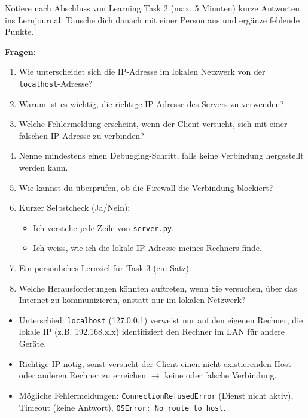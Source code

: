 \begin{myexercise}
    Notiere nach Abschluss von Learning Task 2 (max. 5 Minuten) kurze Antworten ins Lernjournal. Tausche dich danach mit einer Person aus und ergänze fehlende Punkte.

    \textbf{Fragen:}
    \begin{enumerate}
        \item Wie unterscheidet sich die \gls{IP}-Adresse im lokalen Netzwerk von der \texttt{localhost}-Adresse?
        \item Warum ist es wichtig, die richtige \gls{IP}-Adresse des Servers zu verwenden?
        \item Welche Fehlermeldung erscheint, wenn der Client versucht, sich mit einer falschen \gls{IP}-Adresse zu verbinden?
        \item Nenne mindestens einen Debugging-Schritt, falls keine Verbindung hergestellt werden kann.
        \item Wie kannst du überprüfen, ob die Firewall die Verbindung blockiert?
        \item Kurzer Selbstcheck (Ja/Nein):
              \begin{itemize}
                  \item Ich verstehe jede Zeile von \texttt{server.py}.
                  \item Ich weiss, wie ich die lokale IP-Adresse meines Rechners finde.
              \end{itemize}
        \item Ein persönliches Lernziel für Task 3 (ein Satz).
        \item Welche Herausforderungen könnten auftreten, wenn Sie versuchen, über das Internet zu kommunizieren, anstatt nur im lokalen Netzwerk?
    \end{enumerate}
    \begin{myanswer}
        \begin{itemize}
            \item Unterschied: \texttt{localhost} (127.0.0.1) verweist nur auf den eigenen Rechner; die lokale IP (z.B. 192.168.x.x) identifiziert den Rechner im LAN für andere Geräte.
            \item Richtige \gls{IP} nötig, sonst versucht der Client einen nicht existierenden Host oder anderen Rechner zu erreichen $\rightarrow$ keine oder falsche Verbindung.
            \item Mögliche Fehlermeldungen: \texttt{ConnectionRefusedError} (Dienst nicht aktiv), Timeout (keine Antwort), \texttt{OSError: No route to host}.

\end{itemize}
\end{myanswer}
\end{myexercise}
